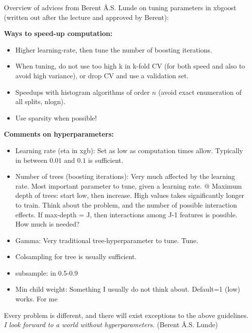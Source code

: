 \documentclass[
  ignorenonframetext,
]{beamer}
\providecommand{\tightlist}{%
  \setlength{\itemsep}{0pt}\setlength{\parskip}{0pt}}
\begin{document}
\begin{frame}
Overview of advices from Berent Å.S. Lunde on tuning parameters in
xbgoost (written out after the lecture and approved by Berent):

\textbf{Ways to speed-up computation:}

\begin{itemize}
\tightlist
\item
  Higher learning-rate, then tune the number of boosting iterations.
\item
  When tuning, do not use too high k in k-fold CV (for both speed and
  also to avoid high variance), or drop CV and use a validation set.
\item
  Speedups with histogram algorithms of order \(n\) (avoid exact
  enumeration of all splits, nlogn).
\item
  Use sparsity when possible!
\end{itemize}
\end{frame}

\begin{frame}
\textbf{Comments on hyperparameters:}

\begin{itemize}
\tightlist
\item
  Learning rate (eta in xgb): Set as low as computation times allow.
  Typically in between \(0.01\) and \(0.1\) is sufficient.
\item
  Number of trees (boosting iterations): Very much affected by the
  learning rate. Most important parameter to tune, given a learning
  rate. @ Maximum depth of trees: start low, then increase. High values
  takes significantly longer to train. Think about the problem, and the
  number of possible interaction effects. If max-depth = J, then
  interactions among J-1 features is possible. How much is needed?
\item
  Gamma: Very traditional tree-hyperparameter to tune. Tune.
\item
  Colsampling for tree is usually sufficient.
\item
  subsample: in 0.5-0.9
\item
  Min child weight: Something I usually do not think about. Default=1
  (low) works. For me
\end{itemize}

Every problem is different, and there will exist exceptions to the above
guidelines. \emph{I look forward to a world without hyperparameters.}
(Berent Å.S. Lunde)
\end{frame}
\end{document}
